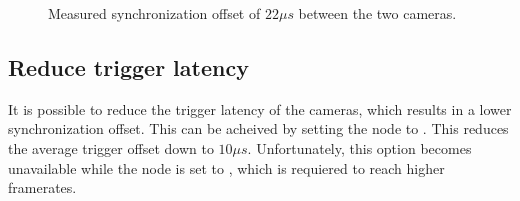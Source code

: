 \begin{figure}
    \centering
    \caption{Measured synchronization offset of $22\mu s$ between the two cameras.}
    \label{fig:sync_offset}
\end{figure}


\subsection{Reduce trigger latency}
It is possible to reduce the trigger latency of the cameras, which results in a lower synchronization offset.
This can be acheived by setting the  node to .
This reduces the average trigger offset down to $10\mu s$.
Unfortunately, this option becomes unavailable while the  node is set to , which is requiered to reach higher framerates.